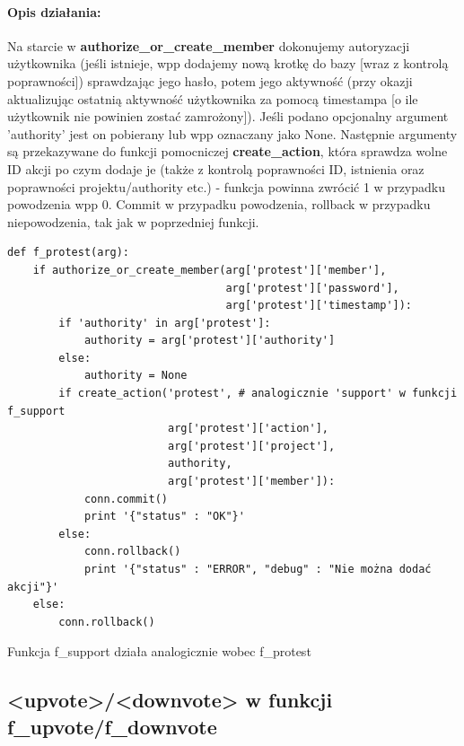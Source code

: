 \documentclass{article}
\begin{document}
\paragraph{Opis działania: }
Na starcie w \textbf{authorize\_or\_create\_member} dokonujemy autoryzacji użytkownika
(jeśli istnieje, wpp dodajemy nową krotkę do bazy [wraz z kontrolą poprawności]) sprawdzając jego hasło, potem jego aktywność (przy okazji aktualizując ostatnią aktywność użytkownika za pomocą timestampa [o ile użytkownik nie powinien zostać zamrożony]). \newline
Jeśli podano opcjonalny argument 'authority' jest on pobierany lub wpp oznaczany jako None. Następnie argumenty są przekazywane do funkcji pomocniczej \textbf{create\_action}, która sprawdza wolne ID akcji po czym dodaje je (także z kontrolą poprawności ID, istnienia oraz poprawności projektu/authority etc.) - funkcja powinna zwrócić 1 w przypadku powodzenia wpp 0.\newline
Commit w przypadku powodzenia, rollback w przypadku niepowodzenia, tak jak w poprzedniej funkcji.
\begin{verbatim}
def f_protest(arg):
    if authorize_or_create_member(arg['protest']['member'],
                                  arg['protest']['password'],
                                  arg['protest']['timestamp']):  
        if 'authority' in arg['protest']: 
            authority = arg['protest']['authority']
        else: 
            authority = None
        if create_action('protest', # analogicznie 'support' w funkcji f_support 
                         arg['protest']['action'],
                         arg['protest']['project'],
                         authority,
                         arg['protest']['member']):
            conn.commit()
            print '{"status" : "OK"}'
        else: 
            conn.rollback()
            print '{"status" : "ERROR", "debug" : "Nie można dodać akcji"}'
    else:
        conn.rollback()
\end{verbatim}
Funkcja f\_support działa analogicznie wobec f\_protest






\newpage
\subsection{<upvote>/<downvote> w funkcji f\_upvote/f\_downvote }
\end{document}
